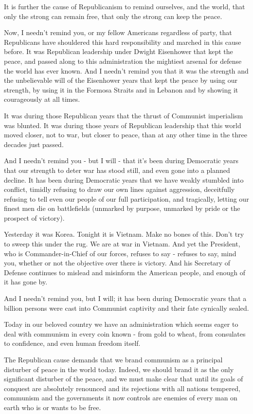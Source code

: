 \documentclass{article}
\begin{document}
It is further the cause of Republicanism to remind ourselves, and the world,
that only the strong can remain free, that only the strong can keep the peace.

Now, I needn't remind you, or my fellow Americans regardless of party, that
Republicans have shouldered this hard responsibility and marched in this cause
before. It was Republican leadership under Dwight Eisenhower that kept the
peace, and passed along to this administration the mightiest arsenal for
defense the world has ever known. And I needn't remind you that it was the
strength and the unbelievable will of the Eisenhower years that kept the peace
by using our strength, by using it in the Formosa Straits and in Lebanon and by
showing it courageously at all times.

It was during those Republican years that the thrust of Communist imperialism
was blunted. It was during those years of Republican leadership that this world
moved closer, not to war, but closer to peace, than at any other time in the
three decades just passed.

And I needn't remind you - but I will - that it's been during Democratic years
that our strength to deter war has stood still, and even gone into a planned
decline. It has been during Democratic years that we have weakly stumbled into
conflict, timidly refusing to draw our own lines against aggression,
deceitfully refusing to tell even our people of our full participation, and
tragically, letting our finest men die on battlefields (unmarked by purpose,
unmarked by pride or the prospect of victory).

Yesterday it was Korea. Tonight it is Vietnam. Make no bones of this. Don't try
to sweep this under the rug. We are at war in Vietnam. And yet the President,
who is Commander-in-Chief of our forces, refuses to say - refuses to say, mind
you, whether or not the objective over there is victory. And his Secretary of
Defense continues to mislead and misinform the American people, and enough of
it has gone by.

And I needn't remind you, but I will; it has been during Democratic years that
a billion persons were cast into Communist captivity and their fate cynically
sealed.

Today in our beloved country we have an administration which seems eager to
deal with communism in every coin known - from gold to wheat, from consulates
to confidence, and even human freedom itself.

The Republican cause demands that we brand communism as a principal disturber
of peace in the world today. Indeed, we should brand it as the only significant
disturber of the peace, and we must make clear that until its goals of conquest
are absolutely renounced and its rejections with all nations tempered,
communism and the governments it now controls are enemies of every man on earth
who is or wants to be free.
\end{document}
